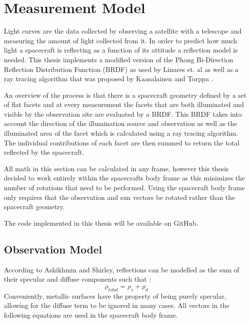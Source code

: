 \chapter{Measurement Model}


Light curves are the data collected by observing a satellite with a telescope and measuring the amount of light collected from it. In order to predict how much light a spacecraft is reflecting as a function of its attitude a reflection model is needed. This thesis implements a modified version of the Phong Bi-Direction Reflection Distribution Function (BRDF) as used by Linares et. al \cite{Linares_data_fusion} as well as a ray tracing algorithm that was proposed by Kaasalainen and Torppa \cite{kaasalainen_LCI}.

An overview of the process is that there is a spacecraft geometry defined by a set of flat facets and at every measurement the facets that are both illuminated and visible by the observation site are evaluated by a BRDF. This BRDF takes into account the direction of the illumination source and observation as well as the illuminated area of the facet which is calculated using a ray tracing algorithm. The individual contributions of each facet are then summed to return the total reflected by the spacecraft.

All math in this section can be calculated in any frame, however this thesis decided to work entirely within the spacecrafts body frame as this minimizes the number of rotations that need to be performed. Using the spacecraft body frame only requires that the observation and sun vectors be rotated rather than the spacecraft geometry.

The code implemented in this thesis will be available on GitHub.

\section{Observation Model}

According to Ashikhmin and Shirley, reflections can be modelled as the sum of their specular and diffuse components such that \cite{phong_brdf}:
\begin{equation}
\rho_{total} = \rho_s + \rho_d
\end{equation}
Conveniently, metallic surfaces have the property of being purely specular, allowing for the diffuse term to be ignored in many cases\cite{phong_brdf}. All vectors in the following equations are used in the spacecraft body frame.

